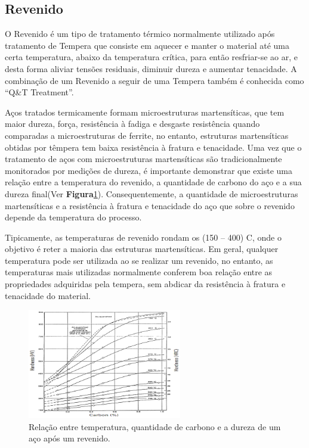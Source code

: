 \subsection{Revenido} \label{ssec:soa_tratamentos_revenido}

O Revenido é um tipo de tratamento térmico normalmente utilizado após tratamento de Tempera que consiste em aquecer e manter o material até uma certa temperatura, abaixo da temperatura crítica, para então resfriar-se ao ar, e desta forma aliviar tensões residuais, diminuir dureza e aumentar tenacidade\cite{Krauss2015}. A combinação de um Revenido a seguir de uma Tempera também é conhecida como “Q\&T Treatment”.
\par
Aços tratados termicamente formam microestruturas martensíticas, que tem maior dureza, força, resistência à fadiga e desgaste resistência quando comparadas a microestruturas de ferrite, no entanto, estruturas martensíticas obtidas por têmpera tem baixa resistência à fratura e tenacidade\cite{Krauss2001}. Uma vez que o tratamento de aços com microestruturas martensíticas são tradicionalmente monitorados por medições de dureza, é importante demonstrar que existe uma relação entre a temperatura do revenido, a quantidade de carbono do aço e a sua dureza final(Ver \textbf{Figura}\ref{fig:Hardness_Temperature_Carbon}). Consequentemente, a quantidade de microestruturas martensíticas e a resistência à fratura e tenacidade do aço que sobre o revenido depende da temperatura do processo.
\par
Tipicamente, as temperaturas de revenido rondam os (150 – 400) \textdegree C, onde o objetivo é reter a maioria das estruturas martensíticas. Em geral, qualquer temperatura pode ser utilizada ao se realizar um revenido, no entanto, as temperaturas mais utilizadas normalmente conferem boa relação entre as propriedades adquiridas pela tempera, sem abdicar da resistência à fratura e tenacidade do material.
\begin{figure}[htb]
    \centering
    \includegraphics[width = 0.6\textwidth]{Figures/Cap2/Hardness_Temperature_Carbon.png}
    \caption[Relação Revenido: Dureza x Temperatura]%
    {Relação entre temperatura, quantidade de carbono e a dureza de um aço após um revenido\cite{Krauss2001}.}
    \label{fig:Hardness_Temperature_Carbon}
\end{figure}
